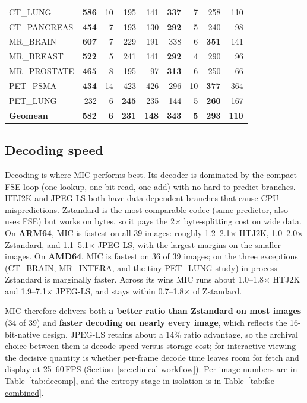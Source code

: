 \documentclass[journal]{IEEEtran}
\begin{document}
\begin{table}[htbp]
\begin{tabular}{l|rrrr|rrrr}
CT\_LUNG       & \textbf{586} & 10 & 195 & 141 & \textbf{337} & 7 & 258 & 110 \\
CT\_PANCREAS   & \textbf{454} & 7 & 193 & 130 & \textbf{292} & 5 & 240 & 98 \\
MR\_BRAIN      & \textbf{607} & 7 & 229 & 191 & 338 & 6 & \textbf{351} & 141 \\
MR\_BREAST     & \textbf{522} & 5 & 241 & 141 & \textbf{292} & 4 & 290 & 96 \\
MR\_PROSTATE   & \textbf{465} & 8 & 195 & 97 & \textbf{313} & 6 & 250 & 66 \\
PET\_PSMA      & \textbf{434} & 14 & 423 & 426 & 296 & 10 & \textbf{377} & 364 \\
PET\_LUNG      & 232 & 6 & \textbf{245} & 235 & 144 & 5 & \textbf{260} & 167 \\
\midrule
\textbf{Geomean} & \textbf{582} & \textbf{6} & \textbf{231} & \textbf{148} & \textbf{343} & \textbf{5} & \textbf{293} & \textbf{110} \\
\bottomrule
\end{tabular}
\end{table}

\subsection{Decoding speed}

Decoding is where MIC performs best. Its decoder is dominated by the compact
FSE loop (one lookup, one bit read, one add) with no hard-to-predict branches.
HTJ2K and JPEG-LS both have data-dependent branches that cause CPU
mispredictions. Zstandard is the most comparable codec (same predictor, also
uses FSE) but works on bytes, so it pays the 2$\times$ byte-splitting cost on
wide data. On \textbf{ARM64}, MIC is fastest on all 39 images: roughly
1.2--2.1$\times$ HTJ2K, 1.0--2.0$\times$ Zstandard, and 1.1--5.1$\times$
JPEG-LS, with the largest margins on the smaller images. On \textbf{AMD64}, MIC
is fastest on 36 of 39 images; on the three exceptions (CT\_BRAIN, MR\_INTERA,
and the tiny PET\_LUNG study) in-process Zstandard is marginally faster. Across
its wins MIC runs about 1.0--1.8$\times$ HTJ2K and 1.9--7.1$\times$ JPEG-LS, and
stays within 0.7--1.8$\times$ of Zstandard.

MIC therefore delivers both \textbf{a better ratio than Zstandard on most
images} (34 of 39) and \textbf{faster decoding on nearly every image}, which
reflects the 16-bit-native design. JPEG-LS retains about a 14\% ratio
advantage, so the archival choice between them is decode speed versus storage
cost; for interactive viewing the decisive quantity is whether per-frame decode
time leaves room for fetch and display at 25--60\,FPS
(Section~\ref{sec:clinical-workflow}). Per-image numbers are in
Table~\ref{tab:decomp}, and the entropy stage in isolation is in
Table~\ref{tab:fse-combined}.
\end{document}
